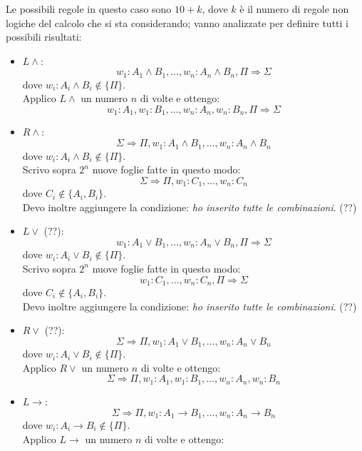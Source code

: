 \documentclass[a4paper,12pt]{article}
\newcommand{\latinmodern}[1]{\text{#1}}
\newcommand{\latinmath}[1]{\text{\latinmodern{#1}}} %
\newcommand{\To}{\Rightarrow} %
\begin{document}
\begin{defin}
\begin{description}
\begin{enumerate}
			            Le possibili regole in questo caso sono $10+k$, dove $k$ è il numero di regole non logiche del calcolo \latinmath{G3L} che si sta considerando; vanno analizzate per definire tutti i possibili risultati:
			            \begin{itemize}
				            \item $L\land$: $$w_1 : A_1 \land B_1, \ldots, w_n : A_n \land B_n, \Pi \To \Sigma$$
				                  dove $w_i : A_i \land B_i \notin \{\Pi\}$. \\
				                  Applico $L\land$ un numero $n$ di volte e ottengo:
				                  $$w_1 : A_1, w_1 : B_1, \ldots, w_n : A_n, w_n : B_n, \Pi \To \Sigma$$
				            \item $R\land$: $$\Sigma \To \Pi, w_1 : A_1 \land B_1, \ldots, w_n : A_n \land B_n$$
				                  dove $w_i : A_i \land B_i \notin \{\Pi\}$. \\
				                  Scrivo sopra $2^n$ nuove foglie fatte in questo modo:
				                  $$\Sigma \To \Pi, w_1 : C_1, \ldots, w_n : C_n$$
				                  dove $C_i \notin \{A_i, B_i\}$. \\
				                  Devo inoltre aggiungere la condizione: \emph{ho inserito tutte le combinazioni}. (??)
				            \item $L\lor$ (??): $$w_1 : A_1 \lor B_1, \ldots, w_n : A_n \lor B_n, \Pi \To \Sigma$$
				                  dove $w_i : A_i \lor B_i \notin \{\Pi\}$. \\
				                  Scrivo sopra $2^n$ nuove foglie fatte in questo modo:
				                  $$w_1 : C_1, \ldots, w_n : C_n, \Pi \To \Sigma$$
				                  dove $C_i \notin \{A_i, B_i\}$. \\
				                  Devo inoltre aggiungere la condizione: \emph{ho inserito tutte le combinazioni}. (??)
				            \item $R\lor$ (??): $$\Sigma \To \Pi, w_1 : A_1 \lor B_1, \ldots, w_n : A_n \lor B_n$$
				                  dove $w_i : A_i \lor B_i \notin \{\Pi\}$. \\
				                  Applico $R\lor$ un numero $n$ di volte e ottengo:
				                  $$\Sigma \To \Pi, w_1 : A_1, w_1 : B_1, \ldots, w_n : A_n, w_n : B_n$$
				            \item $L\to$: $$\Sigma \To \Pi, w_1 : A_1 \to B_1, \ldots, w_n : A_n \to B_n$$
				                  dove $w_i : A_i \to B_i \notin \{\Pi\}$. \\
				                  Applico $L\to$ un numero $n$ di volte e ottengo:

\end{itemize}
\end{enumerate}
\end{description}
\end{defin}
\end{document}
